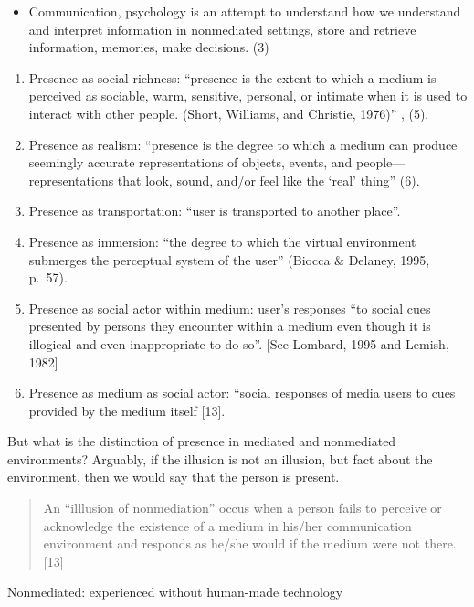 \documentclass[
  letterpaper,
  DIV=11,
  numbers=noendperiod]{scrreprt}
\providecommand{\tightlist}{%
  \setlength{\itemsep}{0pt}\setlength{\parskip}{0pt}}\usepackage{longtable,booktabs,array}
\begin{document}
\begin{tcolorbox}[enhanced jigsaw, arc=.35mm, breakable, rightrule=.15mm, colback=white, colframe=quarto-callout-important-color-frame, bottomrule=.15mm, leftrule=.75mm, opacityback=0, toprule=.15mm, left=2mm]
\begin{tcolorbox}[enhanced jigsaw, arc=.35mm, breakable, rightrule=.15mm, colback=white, colframe=quarto-callout-tip-color-frame, bottomrule=.15mm, leftrule=.75mm, opacityback=0, toprule=.15mm, left=2mm]
\begin{itemize}
\tightlist
\item
  Communication, psychology is an attempt to understand how we
  understand and interpret information in nonmediated settings, store
  and retrieve information, memories, make decisions. (3)
\end{itemize}

\begin{enumerate}
\def\labelenumi{\arabic{enumi}.}
\tightlist
\item
  Presence as social richness: ``presence is the extent to which a
  medium is perceived as sociable, warm, sensitive, personal, or
  intimate when it is used to interact with other people. (Short,
  Williams, and Christie, 1976)'' , (5).
\item
  Presence as realism: ``presence is the degree to which a medium can
  produce seemingly accurate representations of objects, events, and
  people---representations that look, sound, and/or feel like the `real'
  thing'' (6).
\item
  Presence as transportation: ``user is transported to another place''.
\item
  Presence as immersion: ``the degree to which the virtual environment
  submerges the perceptual system of the user'' (Biocca \& Delaney,
  1995, p.~57).
\item
  Presence as social actor within medium: user's responses ``to social
  cues presented by persons they encounter within a medium even though
  it is illogical and even inappropriate to do so''. {[}See Lombard,
  1995 and Lemish, 1982{]}
\item
  Presence as medium as social actor: ``social responses of media users
  to cues provided by the medium itself {[}13{]}.
\end{enumerate}

But what is the distinction of presence in mediated and nonmediated
environments? Arguably, if the illusion is not an illusion, but fact
about the environment, then we would say that the person is present.

\begin{quote}
An ``illlusion of nonmediation'' occus when a person fails to perceive
or acknowledge the existence of a medium in his/her communication
environment and responds as he/she would if the medium were not there.
{[}13{]}
\end{quote}

Nonmediated: experienced without human-made technology


\end{tcolorbox}
\end{tcolorbox}
\end{document}
